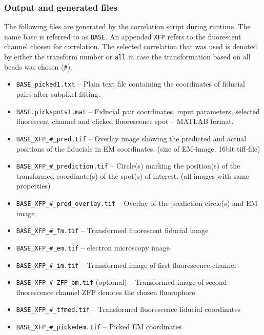 \documentclass[10pt,a4paper,onepage,DIV12]{scrartcl}
\begin{document}
\subsubsection{Output and generated files}
\label{sec:lm_output}
The following files are generated by the correlation script during runtime. The name base is referred to as \texttt{BASE}. An appended \texttt{XFP} refers to the fluorescent channel chosen for correlation. The selected correlation that was used is denoted by either the transform number or \texttt{all} in case the transformation based on all beads was chosen (\texttt{\#}). 
\begin{itemize}
 \item \texttt{BASE\_picked1.txt} -- Plain text file containing the coordinates of fiducial pairs after subpixel fitting. 

\item \texttt{BASE.pickspots1.mat} -- Fiducial pair coordinates, input parameters, selected fluorescent channel and clicked fluorescence spot -- MATLAB format.

% 


\item \texttt{BASE\_XFP\_\#\_pred.tif} -- Overlay image showing the predicted and actual positions of the fiducials in EM coordinates. (size of EM-image, 16bit tiff-file)
\item \texttt{BASE\_XFP\_\#\_prediction.tif} -- Circle(s) marking the position(s) of the transformed coordinate(s) of the spot(s) of interest. (all images with same properties)
\item \texttt{BASE\_XFP\_\#\_pred\_overlay.tif} -- Overlay of the prediction circle(s) and EM image
\item \texttt{BASE\_XFP\_\#\_fm.tif} -- Transformed fluorescent fiducial image 
\item \texttt{BASE\_XFP\_\#\_em.tif} -- electron microscopy image 
\item \texttt{BASE\_XFP\_\#\_im.tif} -- Transformed image of first fluorescence channel
\item \texttt{BASE\_XFP\_\#\_ZFP\_om.tif} (optional) -- Transformed image of second fluorescence channel ZFP denotes the chosen fluorophore.
\item \texttt{BASE\_XFP\_\#\_tfmed.tif} -- Transformed fluorescence fiducial coordinates
\item \texttt{BASE\_XFP\_\#\_pickedem.tif} -- Picked EM coordinates


\end{itemize}
\end{document}

